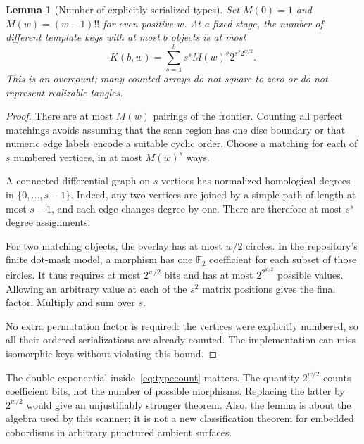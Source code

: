 \documentclass[11pt,letterpaper]{article}
\newtheorem{lemma}[theorem]{Lemma}
\newcommand{\F}{\mathbb F_2}
\begin{document}
\begin{lemma}[Number of explicitly serialized types]\label{lem:typecount}
Set $M(0)=1$ and $M(w)=(w-1)!!$ for even positive $w$. At a fixed stage,
the number of different template keys with at most $b$ objects is at most
\begin{equation}\label{eq:typecount}
 K(b,w)=\sum_{s=1}^{b}s^s M(w)^s 2^{s^2 2^{w/2}}.
\end{equation}
This is an overcount; many counted arrays do not square to zero or do not
represent realizable tangles.
\end{lemma}
\begin{proof}
There are at most $M(w)$ pairings of the frontier. Counting all perfect
matchings avoids assuming that the scan region has one disc boundary or
that numeric edge labels encode a suitable cyclic order. Choose a matching
for each of $s$ numbered vertices, in at most $M(w)^s$ ways.

A connected differential graph on $s$ vertices has normalized homological
degrees in $\{0,\ldots,s-1\}$. Indeed, any two vertices are joined by a
simple path of length at most $s-1$, and each edge changes degree by one.
There are therefore at most $s^s$ degree assignments.

For two matching objects, the overlay has at most $w/2$ circles. In the
repository's finite dot-mask model, a morphism has one $\F$ coefficient
for each subset of those circles. It thus requires at most $2^{w/2}$ bits
and has at most $2^{2^{w/2}}$ possible values. Allowing an arbitrary value
at each of the $s^2$ matrix positions gives the final factor. Multiply and
sum over $s$.

No extra permutation factor is required: the vertices were explicitly
numbered, so all their ordered serializations are already counted. The
implementation can miss isomorphic keys without violating this bound.
\end{proof}

The double exponential inside~\eqref{eq:typecount} matters. The quantity
$2^{w/2}$ counts coefficient bits, not the number of possible morphisms.
Replacing the latter by $2^{w/2}$ would give an unjustifiably stronger theorem.
Also, the lemma is about the algebra used by this scanner; it is not a new
classification theorem for embedded cobordisms in arbitrary punctured
ambient surfaces.
\end{document}
